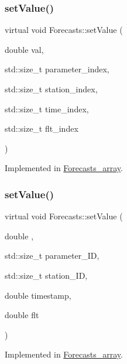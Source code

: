 \subsubsection{\texorpdfstring{set\+Value()}{setValue()}\hspace{0.1cm}{\footnotesize\ttfamily [1/2]}}
{\footnotesize\ttfamily virtual void Forecasts\+::set\+Value (\begin{DoxyParamCaption}\item[{double}]{val,  }\item[{std\+::size\+\_\+t}]{parameter\+\_\+index,  }\item[{std\+::size\+\_\+t}]{station\+\_\+index,  }\item[{std\+::size\+\_\+t}]{time\+\_\+index,  }\item[{std\+::size\+\_\+t}]{flt\+\_\+index }\end{DoxyParamCaption})\hspace{0.3cm}{\ttfamily [pure virtual]}}



Implemented in \mbox{\hyperlink{class_forecasts__array_a19d59c93e8b7692ebae2d3e15dc43f87}{Forecasts\+\_\+array}}.

\mbox{\label{class_forecasts_a584820dc47f1b5c4cae099485ee59cbe}} 
\subsubsection{\texorpdfstring{set\+Value()}{setValue()}\hspace{0.1cm}{\footnotesize\ttfamily [2/2]}}
{\footnotesize\ttfamily virtual void Forecasts\+::set\+Value (\begin{DoxyParamCaption}\item[{double}]{,  }\item[{std\+::size\+\_\+t}]{parameter\+\_\+\+ID,  }\item[{std\+::size\+\_\+t}]{station\+\_\+\+ID,  }\item[{double}]{timestamp,  }\item[{double}]{flt }\end{DoxyParamCaption})\hspace{0.3cm}{\ttfamily [pure virtual]}}



Implemented in \mbox{\hyperlink{class_forecasts__array_a7224d8333630fcd162a1b69b49241d2f}{Forecasts\+\_\+array}}.

